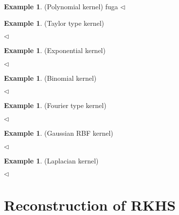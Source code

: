 \documentclass[a4paper,12pt]{article}
\theoremstyle{remark}
\theoremstyle{definition}
\theoremstyle{definition}
\newtheorem{ex}[thm]{Example}
\theoremstyle{definition}
\newcommand{\fin}{\hfill \( \triangleleft \) }
\begin{document}
\begin{ex}(Polynomial kernel)
	fuga
	\fin\end{ex}

\begin{ex} (Taylor type kernel)


	\fin\end{ex}

\begin{ex}(Exponential kernel)

	\fin\end{ex}

\begin{ex}(Binomial kernel)

	\fin\end{ex}

\begin{ex} (Fourier type kernel)

	\fin\end{ex}

\begin{ex} (Gaussian RBF kernel)

	\fin\end{ex}

\begin{ex} (Laplacian kernel)

	\fin\end{ex}

\section{Reconstruction of RKHS}
\end{document}
